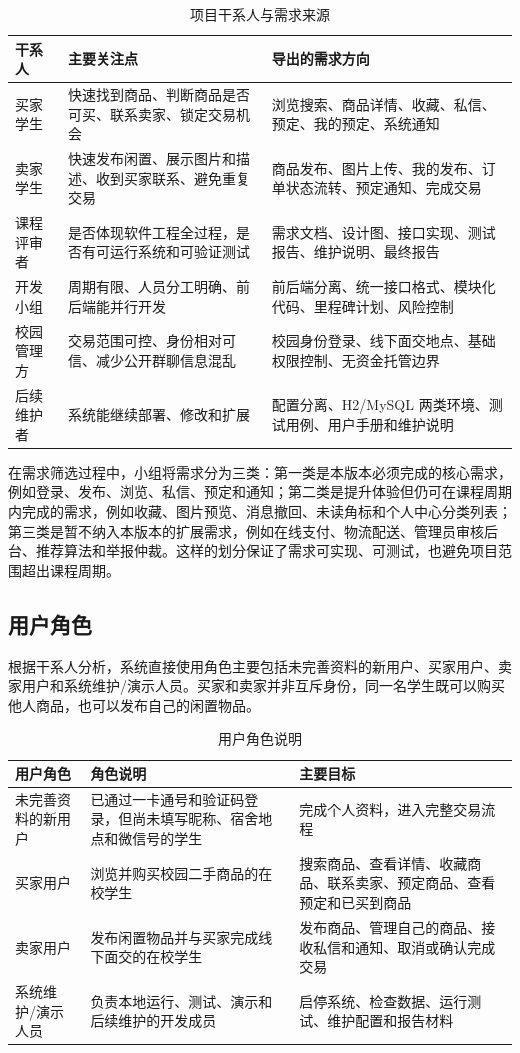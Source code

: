 ﻿\documentclass[UTF8,a4paper,12pt]{ctexart}
\begin{document}
\begin{table}[H]
  \centering
  \caption{项目干系人与需求来源}
  \begin{tabular}{p{2.8cm}p{4.2cm}p{6.5cm}}
    \toprule
    干系人 & 主要关注点 & 导出的需求方向 \\
    \midrule
    买家学生 & 快速找到商品、判断商品是否可买、联系卖家、锁定交易机会 & 浏览搜索、商品详情、收藏、私信、预定、我的预定、系统通知 \\
    卖家学生 & 快速发布闲置、展示图片和描述、收到买家联系、避免重复交易 & 商品发布、图片上传、我的发布、订单状态流转、预定通知、完成交易 \\
    课程评审者 & 是否体现软件工程全过程，是否有可运行系统和可验证测试 & 需求文档、设计图、接口实现、测试报告、维护说明、最终报告 \\
    开发小组 & 周期有限、人员分工明确、前后端能并行开发 & 前后端分离、统一接口格式、模块化代码、里程碑计划、风险控制 \\
    校园管理方 & 交易范围可控、身份相对可信、减少公开群聊信息混乱 & 校园身份登录、线下面交地点、基础权限控制、无资金托管边界 \\
    后续维护者 & 系统能继续部署、修改和扩展 & 配置分离、H2/MySQL 两类环境、测试用例、用户手册和维护说明 \\
    \bottomrule
  \end{tabular}
\end{table}

在需求筛选过程中，小组将需求分为三类：第一类是本版本必须完成的核心需求，例如登录、发布、浏览、私信、预定和通知；第二类是提升体验但仍可在课程周期内完成的需求，例如收藏、图片预览、消息撤回、未读角标和个人中心分类列表；第三类是暂不纳入本版本的扩展需求，例如在线支付、物流配送、管理员审核后台、推荐算法和举报仲裁。这样的划分保证了需求可实现、可测试，也避免项目范围超出课程周期。

\subsection{用户角色}
根据干系人分析，系统直接使用角色主要包括未完善资料的新用户、买家用户、卖家用户和系统维护/演示人员。买家和卖家并非互斥身份，同一名学生既可以购买他人商品，也可以发布自己的闲置物品。

\begin{table}[H]
  \centering
  \caption{用户角色说明}
  \begin{tabular}{p{2.8cm}p{5cm}p{5.8cm}}
    \toprule
    用户角色 & 角色说明 & 主要目标 \\
    \midrule
    未完善资料的新用户 & 已通过一卡通号和验证码登录，但尚未填写昵称、宿舍地点和微信号的学生 & 完成个人资料，进入完整交易流程 \\
    买家用户 & 浏览并购买校园二手商品的在校学生 & 搜索商品、查看详情、收藏商品、联系卖家、预定商品、查看预定和已买到商品 \\
    卖家用户 & 发布闲置物品并与买家完成线下面交的在校学生 & 发布商品、管理自己的商品、接收私信和通知、取消或确认完成交易 \\
    系统维护/演示人员 & 负责本地运行、测试、演示和后续维护的开发成员 & 启停系统、检查数据、运行测试、维护配置和报告材料 \\
    \bottomrule
  \end{tabular}
\end{table}
\end{document}
